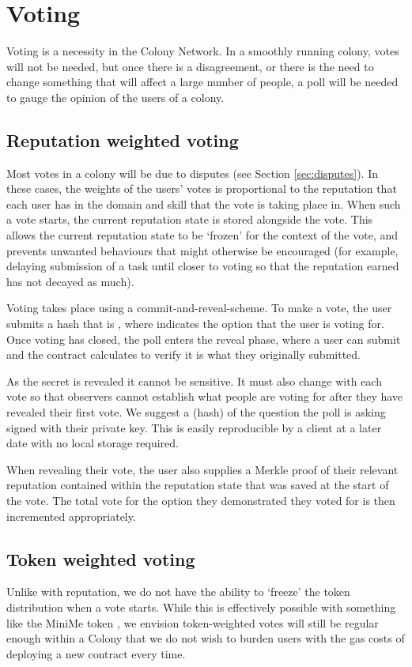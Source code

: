 \section{Voting}\label{sec:voting}
Voting is a necessity in the Colony Network. In a smoothly running colony, votes will not be needed, but once there is a disagreement, or there is the need to change something that will affect a large number of people, a poll will be needed to gauge the opinion of the users of a colony.

\subsection{Reputation weighted voting}
Most votes in a colony will be due to disputes (see Section \ref{sec:disputes}). In these cases, the weights of the users' votes is proportional to the reputation that each user has in the domain and skill that the vote is taking place in. When such a vote starts, the current reputation state is stored alongside the vote. This allows the current reputation state to be `frozen' for the context of the vote, and prevents unwanted behaviours that might otherwise be encouraged (for example, delaying submission of a task until closer to voting so that the reputation earned has not decayed as much).

Voting takes place using a commit-and-reveal-scheme. To make a vote, the user submits a hash that is , where  indicates the option that the user is voting for. Once voting has closed, the poll enters the reveal phase, where a user can submit  and the contract calculates  to verify it is what they originally submitted.

As the secret is revealed it cannot be sensitive. It must also change with each vote so that observers cannot establish what people are voting for after they have revealed their first vote. We suggest a (hash) of the question the poll is asking signed with their private key. This is easily reproducible by a client at a later date with no local storage required.

When revealing their vote, the user also supplies a Merkle proof of their relevant reputation contained within the reputation state that was saved at the start of the vote. The total vote for the option they demonstrated they voted for is then incremented appropriately.

\subsection{Token weighted voting}
Unlike with reputation, we do not have the ability to `freeze' the token distribution when a vote starts. While this is effectively possible with something like the MiniMe token \cite{minime}, we envision token-weighted votes will still be regular enough within a Colony that we do not wish to burden users with the gas costs of deploying a new contract every time.

